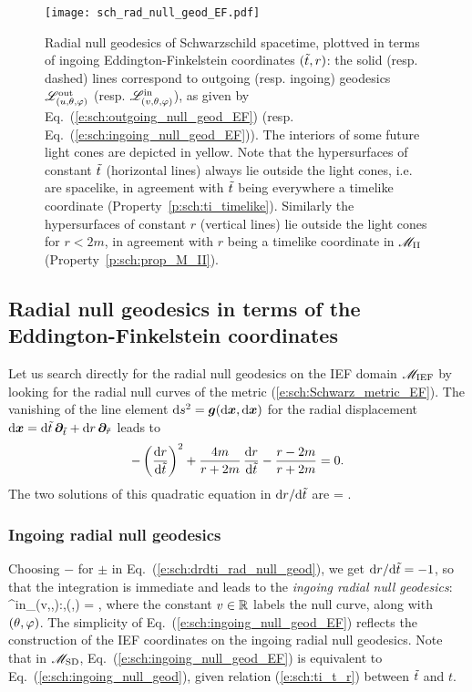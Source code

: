 \begin{figure}
\centerline{\texttt{[image: sch\_rad\_null\_geod\_EF.pdf]}}
\caption[]{\label{f:sch:rad_null_geod_EF} \footnotesize
Radial null geodesics of Schwarzschild spacetime, plottved in terms
of ingoing Eddington-Finkelstein coordinates $({\tilde t},r)$: the solid (resp. dashed) lines
correspond to outgoing (resp. ingoing) geodesics $\mathscr{L}^{\rm out}_{(u,\theta,\varphi)}$
(resp. $\mathscr{L}^{\rm in}_{(v,\theta,\varphi)}$), as given by Eq.~(\ref{e:sch:outgoing_null_geod_EF})
(resp. Eq.~(\ref{e:sch:ingoing_null_geod_EF})). The interiors of some future light
cones are depicted in yellow. Note that the hypersurfaces of constant ${\tilde t}$
(horizontal lines) always lie outside the light cones, i.e. are spacelike, in agreement with
${\tilde t}$ being everywhere a timelike coordinate (Property~\ref{p:sch:ti_timelike}).
Similarly the hypersurfaces of constant $r$ (vertical lines) lie outside the light cones
for $r<2m$, in agreement with $r$ being a timelike coordinate in $\mathscr{M}_{\rm II}$
(Property~\ref{p:sch:prop_M_II}).}
\end{figure}

\subsection{Radial null geodesics in terms of the Eddington-Finkelstein coordinates}
\label{s:sch:radial_null_IEF}

Let us search directly for the radial null geodesics on the IEF domain $\mathscr{M}_{\rm IEF}$
by looking for the radial null curves of the metric (\ref{e:sch:Schwarz_metric_EF}).
The vanishing of the line element $\mathrm{d} s^2 = \bm{g}(\mathrm{d}\bm{x},\mathrm{d}\bm{x})$ for the
radial displacement $\mathrm{d}\bm{x} = \mathrm{d}{\tilde t} \, \bm{\partial}_{{\tilde t}} +  \mathrm{d} r \, \bm{\partial}_{\tilde{r}}$
leads to
\[
    - \left( \frac{\mathrm{d} r}{\mathrm{d} {\tilde t}} \right)^2 + \frac{4 m}{r + 2 m}\,  \frac{\mathrm{d} r}{\mathrm{d} {\tilde t}}
    - \frac{r - 2m}{r + 2m} = 0 .
\]
The two solutions of this quadratic equation in $\mathrm{d} r / \mathrm{d}{\tilde t}$ are
\be \label{e:sch:drdti_rad_null_geod}
     =  .
\ee

\subsubsection{Ingoing radial null geodesics}

Choosing $-$ for $\pm$ in Eq.~(\ref{e:sch:drdti_rad_null_geod}),
we get $\mathrm{d} r / \mathrm{d} {\tilde t} = -1$, so that the integration is
immediate and leads to the \emph{ingoing radial null geodesics}:
\be \label{e:sch:ingoing_null_geod_EF}
    \Li^{\rm in}_{(v,\th,\ph)}:\quad {},\quad (\th,\ph) = ,
\ee
where the constant $v\in \mathbb{R}$ labels the null curve, along with $(\theta,\varphi)$.
The simplicity of Eq.~(\ref{e:sch:ingoing_null_geod_EF})
reflects the construction of the IEF coordinates on the ingoing radial null geodesics.
Note that in
$\mathscr{M}_{\rm SD}$, Eq.~(\ref{e:sch:ingoing_null_geod_EF}) is equivalent to Eq.~(\ref{e:sch:ingoing_null_geod}),
given relation (\ref{e:sch:ti_t_r}) between ${\tilde t}$ and $t$.

